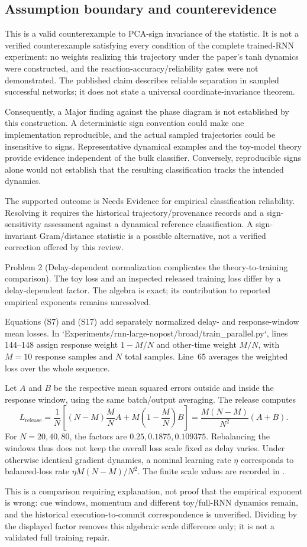 \documentclass[10pt]{article}
\begin{document}
\subsection*{Assumption boundary and counterevidence}
This is a valid counterexample to PCA-sign invariance of the statistic. It is not a verified counterexample satisfying every condition of the complete trained-RNN experiment: no weights realizing this trajectory under the paper’s tanh dynamics were constructed, and the reaction-accuracy/reliability gates were not demonstrated. The published claim describes reliable separation in sampled successful networks; it does not state a universal coordinate-invariance theorem.\par
Consequently, a Major finding against the phase diagram is not established by this construction. A deterministic sign convention could make one implementation reproducible, and the actual sampled trajectories could be insensitive to signs. Representative dynamical examples and the toy-model theory provide evidence independent of the bulk classifier. Conversely, reproducible signs alone would not establish that the resulting classification tracks the intended dynamics.\par
The supported outcome is Needs Evidence for empirical classification reliability. Resolving it requires the historical trajectory/provenance records and a sign-sensitivity assessment against a dynamical reference classification. A sign-invariant Gram/distance statistic is a possible alternative, not a verified correction offered by this review.\par
Problem 2 (Delay-dependent normalization complicates the theory-to-training comparison).  The toy loss and an inspected released training loss differ by a delay-dependent factor. The algebra is exact; its contribution to reported empirical exponents remains unresolved.\par
Equations (S7) and (S17) add separately normalized delay- and response-window mean losses. In `Experiments/rnn-large-nopost/broad/train\_parallel.py`, lines 144–148 assign response weight \(1-M/N\) and other-time weight \(M/N\), with \(M=10\) response samples and \(N\) total samples. Line 65 averages the weighted loss over the whole sequence.\par
Let \(A\) and \(B\) be the respective mean squared errors outside and inside the response window, using the same batch/output averaging. The release computes \[L_{\mathrm{release}}
=\frac{1}{N}\left[(N-M)\frac{M}{N}A
+M\left(1-\frac{M}{N}\right)B\right]
=\frac{M(N-M)}{N^2}(A+B).\] For \(N=20,40,80\), the factors are \(0.25,0.1875,0.109375\). Rebalancing the windows thus does not keep the overall loss scale fixed as delay varies. Under otherwise identical gradient dynamics, a nominal learning rate \(\eta\) corresponds to balanced-loss rate \(\eta M(N-M)/N^2\). The finite scale values are recorded in .\par
This is a comparison requiring explanation, not proof that the empirical exponent is wrong: cue windows, momentum and different toy/full-RNN dynamics remain, and the historical execution-to-commit correspondence is unverified. Dividing by the displayed factor removes this algebraic scale difference only; it is not a validated full training repair.\par
\end{document}
